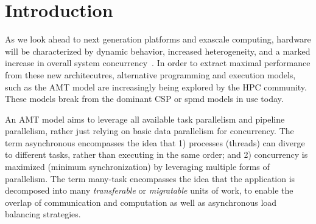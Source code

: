 

\chapter{Introduction}
\label{chap:introduction}
As we look ahead to next generation platforms and exascale computing,  hardware 
will be characterized by dynamic behavior, increased
heterogeneity, and a marked increase in overall system \gls{concurrency}~\cite{doe_arch, dav_exascale}. 
In order to extract maximal performance from these new architecutres,
alternative programming  and \glspl{execution model}, such as the \gls{AMT
model} are increasingly being explored by the HPC community.  These models break from the dominant
\gls{CSP} or \gls{spmd} models in use today. 




An \gls{AMT} model aims to leverage all available \gls{task parallelism} and
\gls{pipeline parallelism}, rather just relying on basic \gls{data
  parallelism} for \gls{concurrency}.
The term asynchronous encompasses the idea that 1) processes (threads) can
  diverge to different tasks, rather than executing in the same order; and 2)
  \gls{concurrency} is maximized (minimum synchronization) by leveraging
  multiple forms of \gls{parallelism}.
	The term many-task encompasses the idea that the application is decomposed
  into many \emph{transferable} or \emph{migratable} units of work, to
  enable the overlap of communication and computation as well as asynchronous load balancing strategies.  


